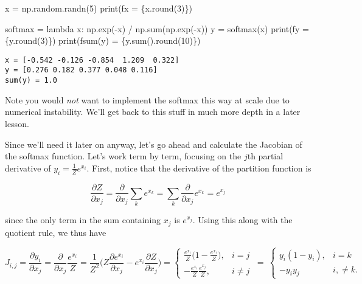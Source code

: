 \documentclass[
  letterpaper,
  DIV=11,
  numbers=noendperiod]{scrreprt}
\newenvironment{Shaded}{\begin{snugshade}}{\end{snugshade}}
\newcommand{\BuiltInTok}[1]{\textcolor[rgb]{0.00,0.23,0.31}{#1}}
\newcommand{\DecValTok}[1]{\textcolor[rgb]{0.68,0.00,0.00}{#1}}
\newcommand{\KeywordTok}[1]{\textcolor[rgb]{0.00,0.23,0.31}{#1}}
\newcommand{\NormalTok}[1]{\textcolor[rgb]{0.00,0.23,0.31}{#1}}
\newcommand{\OperatorTok}[1]{\textcolor[rgb]{0.37,0.37,0.37}{#1}}
\newcommand{\SpecialCharTok}[1]{\textcolor[rgb]{0.37,0.37,0.37}{#1}}
\newcommand{\SpecialStringTok}[1]{\textcolor[rgb]{0.13,0.47,0.30}{#1}}
\begin{document}
\begin{Shaded}
\begin{Highlighting}[]
\NormalTok{x }\OperatorTok{=}\NormalTok{ np.random.randn(}\DecValTok{5}\NormalTok{)}
\BuiltInTok{print}\NormalTok{(}\SpecialStringTok{f\textquotesingle{}x = }\SpecialCharTok{\{}\NormalTok{x}\SpecialCharTok{.}\BuiltInTok{round}\NormalTok{(}\DecValTok{3}\NormalTok{)}\SpecialCharTok{\}}\SpecialStringTok{\textquotesingle{}}\NormalTok{)}

\NormalTok{softmax }\OperatorTok{=} \KeywordTok{lambda}\NormalTok{ x: np.exp(}\OperatorTok{{-}}\NormalTok{x) }\OperatorTok{/}\NormalTok{ np.}\BuiltInTok{sum}\NormalTok{(np.exp(}\OperatorTok{{-}}\NormalTok{x))}
\NormalTok{y }\OperatorTok{=}\NormalTok{ softmax(x)}
\BuiltInTok{print}\NormalTok{(}\SpecialStringTok{f\textquotesingle{}y = }\SpecialCharTok{\{}\NormalTok{y}\SpecialCharTok{.}\BuiltInTok{round}\NormalTok{(}\DecValTok{3}\NormalTok{)}\SpecialCharTok{\}}\SpecialStringTok{\textquotesingle{}}\NormalTok{)}
\BuiltInTok{print}\NormalTok{(}\SpecialStringTok{f\textquotesingle{}sum(y) = }\SpecialCharTok{\{}\NormalTok{y}\SpecialCharTok{.}\BuiltInTok{sum}\NormalTok{()}\SpecialCharTok{.}\BuiltInTok{round}\NormalTok{(}\DecValTok{10}\NormalTok{)}\SpecialCharTok{\}}\SpecialStringTok{\textquotesingle{}}\NormalTok{)}
\end{Highlighting}
\end{Shaded}

\begin{verbatim}
x = [-0.542 -0.126 -0.854  1.209  0.322]
y = [0.276 0.182 0.377 0.048 0.116]
sum(y) = 1.0
\end{verbatim}

Note you would \emph{not} want to implement the softmax this way at
scale due to numerical instability. We'll get back to this stuff in much
more depth in a later lesson.

Since we'll need it later on anyway, let's go ahead and calculate the
Jacobian of the softmax function. Let's work term by term, focusing on
the \(j\)th partial derivative of \(y_i=\frac{1}{Z} e^{x_i}\). First,
notice that the derivative of the partition function is

\[\frac{\partial Z}{\partial x_j} = \frac{\partial}{\partial x_j} \sum_k e^{x_k} = \sum_k \frac{\partial}{\partial x_j} e^{x_k} = e^{x_j}\]

since the only term in the sum containing \(x_j\) is \(e^{x_j}\). Using
this along with the quotient rule, we thus have

\[
J_{i,j} = \frac{\partial y_i}{\partial x_j} = \frac{\partial}{\partial x_j} \frac{e^{x_i}}{Z} = 
\frac{1}{Z^2}\bigg(Z \frac{\partial e^{x_i}}{\partial x_j} - e^{x_i} \frac{\partial Z}{\partial x_j} \bigg) = 
\begin{cases}
\frac{e^{x_i}}{Z} \big(1 - \frac{e^{x_i}}{Z}\big), & i = j \\
-\frac{e^{x_i}}{Z} \frac{e^{x_j}}{Z}, & i \neq j
\end{cases} \ = \
\begin{cases}
y_i (1 - y_i), & i = k \\
-y_i y_j & i, \neq k.
\end{cases}
\]
\end{document}
